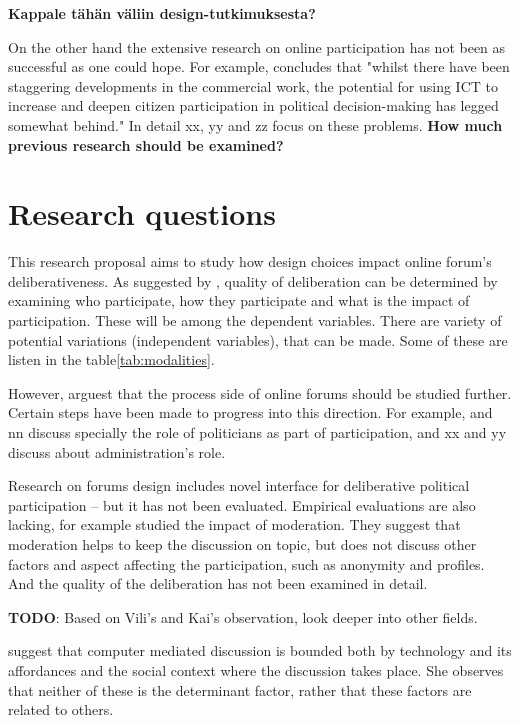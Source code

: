 \documentclass[journal,a4paper]{IEEEtran}
\begin{document}
\textbf{Kappale tähän väliin design-tutkimuksesta?}

On the other hand the extensive research on online participation has not been as successful as one could hope. For example,  concludes that "whilst there have been staggering developments in the commercial work, the potential for using ICT to increase and deepen citizen participation in political decision-making has legged somewhat behind." In detail xx, yy and zz focus on these problems. \textbf{How much previous research should be examined?}

\section{Research questions}

This research proposal aims to study how design choices impact online forum's deliberativeness. As suggested by , quality of deliberation can be determined by examining who participate, how they participate and what is the impact of participation. These will be among the dependent variables. There are variety of potential variations (independent variables), that can be made. Some of these are listen in the table\ref{tab:modalities}.

However,  arguest that the process side of online forums should be studied further. Certain steps have been made to progress into this direction. For example,  and nn discuss specially the role of politicians as part of participation, and xx and yy discuss about administration's role.

Research on forums design includes  novel interface for deliberative political participation -- but it has not been evaluated. Empirical evaluations are also lacking, for example  studied the impact of moderation. They suggest that moderation helps to keep the discussion on topic, but does not discuss other factors and aspect affecting the participation, such as anonymity and profiles. And the quality of the deliberation has not been examined in detail.

\textbf{TODO}: Based on Vili's and Kai's observation, look deeper into other fields.

 suggest that computer mediated discussion is bounded both by technology and its affordances and the social context where the discussion takes place. She observes that neither of these is the determinant factor, rather that these factors are related to others.
\end{document}
